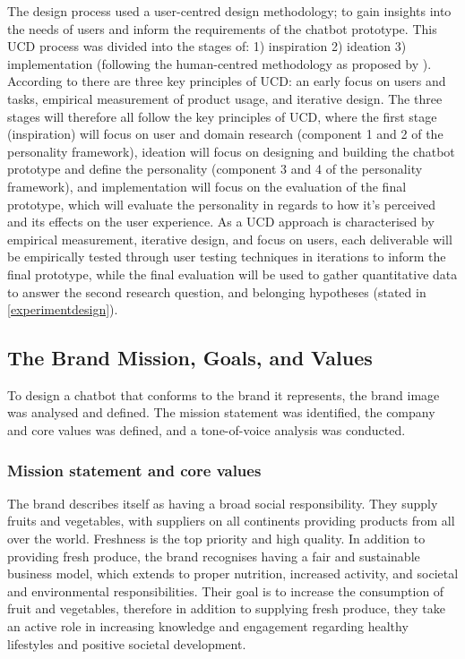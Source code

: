  The design process used a user-centred design methodology; to gain insights into the needs of users and inform the requirements of the chatbot prototype. This UCD process was divided into the stages of:  1) inspiration 2) ideation 3) implementation (following the human-centred methodology as proposed by \cite{IDEO.org}). According to \cite{Gould1985} there are three key principles of UCD: an early focus on users and tasks, empirical measurement of product usage, and iterative design. The three stages will therefore all follow the key principles of UCD, where the first stage (inspiration) will focus on user and domain research (component 1 and 2 of the personality framework), ideation will focus on designing and building the chatbot prototype and define the personality (component 3 and 4 of the personality framework), and implementation will focus on the evaluation of the final prototype, which will evaluate the personality in regards to how it's perceived and its effects on the user experience. As a UCD approach is characterised by empirical measurement, iterative design, and focus on users, each deliverable will be empirically tested through user testing techniques in iterations to inform the final prototype, while the final evaluation will be used to gather quantitative data to answer the second research question, and belonging hypotheses (stated in \ref{experimentdesign}).

\vspace{5mm} %

\subsection{The Brand Mission, Goals, and Values}

To design a chatbot that conforms to the brand it represents, the brand image was analysed and defined. The mission statement was identified, the company and core values was defined, and a tone-of-voice analysis was conducted.
    
\vspace{2,5mm}
    
        \subsubsection{Mission statement and core values}
 
        The brand describes itself as having a broad social responsibility. They supply fruits and vegetables, with suppliers on all continents providing products from all over the world. Freshness is the top priority and high quality. In addition to providing fresh produce, the brand recognises having a fair and sustainable business model, which extends to proper nutrition, increased activity, and societal and environmental responsibilities. Their goal is to increase the consumption of fruit and vegetables, therefore in addition to supplying fresh produce, they take an active role in increasing knowledge and engagement regarding healthy lifestyles and positive societal development.
 
